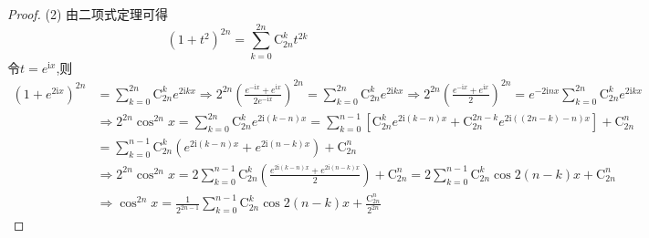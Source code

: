 \documentclass[../../main.tex]{subfiles}
\begin{document}
\begin{proof}
(2) 由二项式定理可得  
$$
(1+t^2)^{2n}=\sum_{k=0}^{2n}{\mathrm{C}_{2n}^{k}t^{2k}}
$$  
令$t=e^{\mathrm{i}x}$,则  
\begin{align*}
(1+e^{2\mathrm{i}x})^{2n}&=\sum_{k=0}^{2n}{\mathrm{C}_{2n}^{k}e^{2\mathrm{i}kx}} \Rightarrow 2^{2n}\left( \frac{e^{-\mathrm{i}x}+e^{\mathrm{i}x}}{2e^{-\mathrm{i}x}} \right) ^{2n}=\sum_{k=0}^{2n}{\mathrm{C}_{2n}^{k}e^{2\mathrm{i}kx}} \Rightarrow 2^{2n}\left( \frac{e^{-\mathrm{i}x}+e^{\mathrm{i}x}}{2} \right) ^{2n}=e^{-2\mathrm{i}nx}\sum_{k=0}^{2n}{\mathrm{C}_{2n}^{k}e^{2\mathrm{i}kx}}\\
&\Rightarrow 2^{2n}\cos ^{2n}x=\sum_{k=0}^{2n}{\mathrm{C}_{2n}^{k}e^{2\mathrm{i}(k-n)x}}=\sum_{k=0}^{n-1}[\mathrm{C}_{2n}^{k}e^{2\mathrm{i}(k-n)x}+\mathrm{C}_{2n}^{2n-k}e^{2\mathrm{i}((2n-k)-n)x}]+\mathrm{C}_{2n}^{n}\\
&=\sum_{k=0}^{n-1}\mathrm{C}_{2n}^{k}(e^{2\mathrm{i}(k-n)x}+e^{2\mathrm{i}(n-k)x})+\mathrm{C}_{2n}^{n}\\
&\Rightarrow 2^{2n}\cos ^{2n}x=2\sum_{k=0}^{n-1}\mathrm{C}_{2n}^{k}\left( \frac{e^{2\mathrm{i}(k-n)x}+e^{2\mathrm{i}(n-k)x}}{2} \right)+\mathrm{C}_{2n}^{n}=2\sum_{k=0}^{n-1}\mathrm{C}_{2n}^{k}\cos 2(n-k)x+\mathrm{C}_{2n}^{n}\\
&\Rightarrow \cos ^{2n}x=\frac{1}{2^{2n-1}}\sum_{k=0}^{n-1}\mathrm{C}_{2n}^{k}\cos 2(n-k)x+\frac{\mathrm{C}_{2n}^{n}}{2^{2n}}
\end{align*}
\end{proof}
\end{document}
